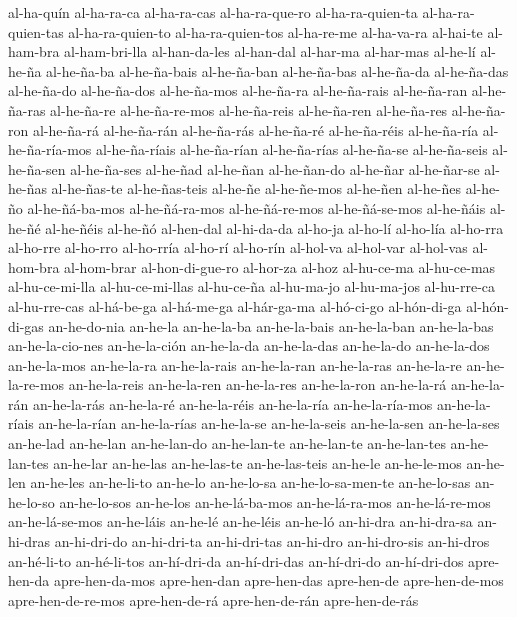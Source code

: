 {al-ha-quín
al-ha-ra-ca
al-ha-ra-cas
al-ha-ra-que-ro
al-ha-ra-quien-ta
al-ha-ra-quien-tas
al-ha-ra-quien-to
al-ha-ra-quien-tos
al-ha-re-me
al-ha-va-ra
al-hai-te
al-ham-bra
al-ham-bri-lla
al-han-da-les
al-han-dal
al-har-ma
al-har-mas
al-he-lí
al-he-ña
al-he-ña-ba
al-he-ña-bais
al-he-ña-ban
al-he-ña-bas
al-he-ña-da
al-he-ña-das
al-he-ña-do
al-he-ña-dos
al-he-ña-mos
al-he-ña-ra
al-he-ña-rais
al-he-ña-ran
al-he-ña-ras
al-he-ña-re
al-he-ña-re-mos
al-he-ña-reis
al-he-ña-ren
al-he-ña-res
al-he-ña-ron
al-he-ña-rá
al-he-ña-rán
al-he-ña-rás
al-he-ña-ré
al-he-ña-réis
al-he-ña-ría
al-he-ña-ría-mos
al-he-ña-ríais
al-he-ña-rían
al-he-ña-rías
al-he-ña-se
al-he-ña-seis
al-he-ña-sen
al-he-ña-ses
al-he-ñad
al-he-ñan
al-he-ñan-do
al-he-ñar
al-he-ñar-se
al-he-ñas
al-he-ñas-te
al-he-ñas-teis
al-he-ñe
al-he-ñe-mos
al-he-ñen
al-he-ñes
al-he-ño
al-he-ñá-ba-mos
al-he-ñá-ra-mos
al-he-ñá-re-mos
al-he-ñá-se-mos
al-he-ñáis
al-he-ñé
al-he-ñéis
al-he-ñó
al-hen-dal
al-hi-da-da
al-ho-ja
al-ho-lí
al-ho-lía
al-ho-rra
al-ho-rre
al-ho-rro
al-ho-rría
al-ho-rí
al-ho-rín
al-hol-va
al-hol-var
al-hol-vas
al-hom-bra
al-hom-brar
al-hon-di-gue-ro
al-hor-za
al-hoz
al-hu-ce-ma
al-hu-ce-mas
al-hu-ce-mi-lla
al-hu-ce-mi-llas
al-hu-ce-ña
al-hu-ma-jo
al-hu-ma-jos
al-hu-rre-ca
al-hu-rre-cas
al-há-be-ga
al-há-me-ga
al-hár-ga-ma
al-hó-ci-go
al-hón-di-ga
al-hón-di-gas
an-he-do-nia
an-he-la
an-he-la-ba
an-he-la-bais
an-he-la-ban
an-he-la-bas
an-he-la-cio-nes
an-he-la-ción
an-he-la-da
an-he-la-das
an-he-la-do
an-he-la-dos
an-he-la-mos
an-he-la-ra
an-he-la-rais
an-he-la-ran
an-he-la-ras
an-he-la-re
an-he-la-re-mos
an-he-la-reis
an-he-la-ren
an-he-la-res
an-he-la-ron
an-he-la-rá
an-he-la-rán
an-he-la-rás
an-he-la-ré
an-he-la-réis
an-he-la-ría
an-he-la-ría-mos
an-he-la-ríais
an-he-la-rían
an-he-la-rías
an-he-la-se
an-he-la-seis
an-he-la-sen
an-he-la-ses
an-he-lad
an-he-lan
an-he-lan-do
an-he-lan-te
an-he-lan-te
an-he-lan-tes
an-he-lan-tes
an-he-lar
an-he-las
an-he-las-te
an-he-las-teis
an-he-le
an-he-le-mos
an-he-len
an-he-les
an-he-li-to
an-he-lo
an-he-lo-sa
an-he-lo-sa-men-te
an-he-lo-sas
an-he-lo-so
an-he-lo-sos
an-he-los
an-he-lá-ba-mos
an-he-lá-ra-mos
an-he-lá-re-mos
an-he-lá-se-mos
an-he-láis
an-he-lé
an-he-léis
an-he-ló
an-hi-dra
an-hi-dra-sa
an-hi-dras
an-hi-dri-do
an-hi-dri-ta
an-hi-dri-tas
an-hi-dro
an-hi-dro-sis
an-hi-dros
an-hé-li-to
an-hé-li-tos
an-hí-dri-da
an-hí-dri-das
an-hí-dri-do
an-hí-dri-dos
apre-hen-da          
apre-hen-da-mos      
apre-hen-dan         
apre-hen-das         
apre-hen-de          
apre-hen-de-mos      
apre-hen-de-re-mos   
apre-hen-de-rá       
apre-hen-de-rán      
apre-hen-de-rás      
}
